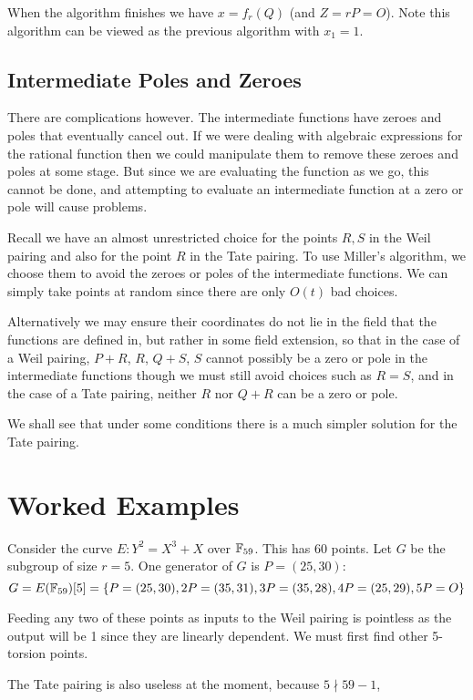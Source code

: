 When the algorithm finishes we have $x = f_r(Q)$ (and $Z = rP = O$).
Note this algorithm can be viewed as the previous algorithm with $x_1 = 1$.

\subsection {Intermediate Poles and Zeroes}

There are complications however. The intermediate functions have zeroes
and poles that eventually cancel out. If we were dealing with algebraic
expressions for the rational function then we could manipulate
them to remove these zeroes and poles at some stage.
But since we are evaluating the function as we go,
this cannot be done, and attempting to evaluate an
intermediate function at a zero
or pole will cause problems.

Recall we have an almost unrestricted choice for the points $R, S$ in
the Weil pairing and also for the point $R$
in the Tate pairing. To use Miller's algorithm, we choose them
to avoid the zeroes or poles
of the intermediate functions. We can simply
take points at random since there are only $O(t)$ bad choices.

Alternatively we may ensure their coordinates do not lie in the
field that the functions are defined in, but rather in some field
extension, so that in the case of a Weil pairing, $P+R$, $R$, $Q+S$, $S$
cannot possibly be a zero or pole in the intermediate functions
though we must still avoid choices such as $R = S$,
and in the case of a Tate pairing, neither $R$ nor $Q + R$
can be a zero or pole.

We shall see that under some conditions there is a much simpler solution
for the Tate pairing.

\section {Worked Examples}

Consider the curve $E : Y^2 = X^3 + X$ over $\mathbb{F}_{59}$.
This has 60 points. Let $G$ be the subgroup of size $r = 5$.
One generator of $G$ is $P = (25, 30)$:
\[ G =
E(\mathbb{F}_{59})[5] =
\{P = (25, 30), 2P = (35, 31), 3P = (35, 28), 4P = (25, 29), 5P = O \} \]

Feeding any two of these points as inputs to the Weil pairing is pointless
as the output will be 1 since they are linearly dependent. We must first
find other 5-torsion points.

The Tate pairing is also useless at the moment, because $5 \nmid 59 - 1$,

